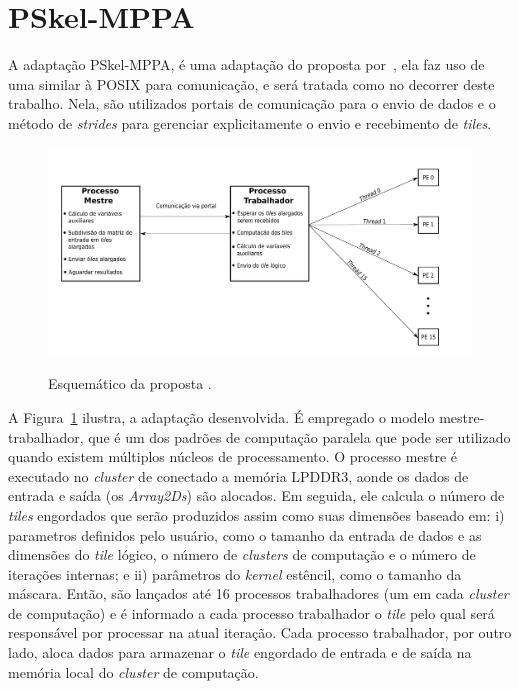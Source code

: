 
\section{PSkel-MPPA}
\label{sec:pskel-mppa}

A adaptação PSkel-MPPA, é uma adaptação do \pskel proposta por~\cite{wscad2017}, ela faz uso de uma \api similar à POSIX \ipc para comunicação, e será tratada como \ipc no decorrer deste trabalho. Nela, são utilizados portais de comunicação para o envio de dados e o método de \textit{strides}  para gerenciar explicitamente o envio e recebimento de \textit{tiles}.

\begin{figure}
    \centering
    \caption{Esquemático da proposta \pskelmppa.}
    \includegraphics[width=1\textwidth]{figs/visaoGeralPSKELMPPATrabalhador.pdf} \\
    \label{fig:visaoGeralPSkelMPPA}
\end{figure}


A Figura~\ref{fig:visaoGeralPSkelMPPA} ilustra, a adaptação
desenvolvida. É empregado o modelo mestre-trabalhador, que é um dos padrões de computação paralela que pode ser utilizado quando existem múltiplos núcleos de processamento. O processo mestre é executado no \emph{cluster} de \io conectado a memória LPDDR3, aonde os dados de entrada e saída (os \emph{Array2Ds}) são alocados. Em seguida, ele calcula o número de \emph{tiles} engordados que serão produzidos assim como suas dimensões baseado em: i) parametros definidos pelo usuário, como o tamanho da entrada de dados e as dimensões do \emph{tile} lógico, o número de \emph{clusters} de computação e o número de iterações internas; e ii) parâmetros do \emph{kernel} estêncil, como o tamanho da máscara. Então, são lançados até 16 processos trabalhadores (um em cada \emph{cluster} de computação) e é informado a cada processo trabalhador o \emph{tile} pelo qual será responsável por processar na atual iteração. Cada processo trabalhador, por outro lado, aloca dados para armazenar o \emph{tile} engordado de entrada e de saída na memória local do \emph{cluster} de computação.

